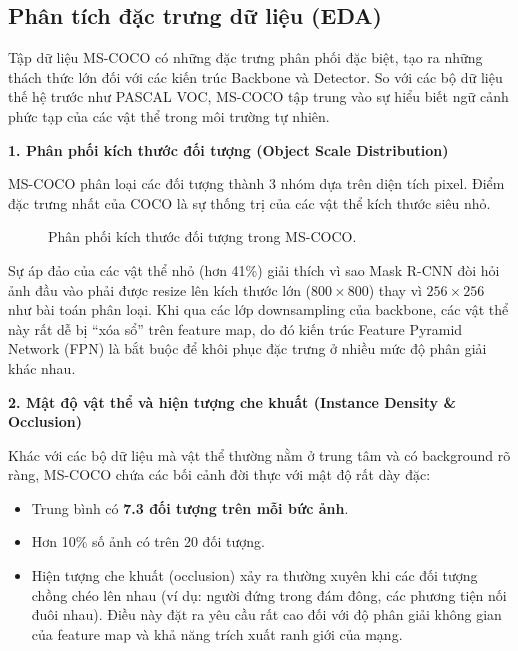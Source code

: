 \subsection{Phân tích đặc trưng dữ liệu (EDA)}
\label{subsec:coco_eda}

Tập dữ liệu MS-COCO có những đặc trưng phân phối đặc biệt, tạo ra những thách thức lớn đối với các kiến trúc Backbone và Detector. So với các bộ dữ liệu thế hệ trước như PASCAL VOC, MS-COCO tập trung vào sự hiểu biết ngữ cảnh phức tạp của các vật thể trong môi trường tự nhiên.

\textbf{1. Phân phối kích thước đối tượng (Object Scale Distribution)}

MS-COCO phân loại các đối tượng thành 3 nhóm dựa trên diện tích pixel. Điểm đặc trưng nhất của COCO là sự thống trị của các vật thể kích thước siêu nhỏ.

\begin{figure}[H]
\centering
{}
\caption{Phân phối kích thước đối tượng trong MS-COCO.}
\label{fig:coco_scale}
\end{figure}

Sự áp đảo của các vật thể nhỏ (hơn 41\%) giải thích vì sao Mask R-CNN đòi hỏi ảnh đầu vào phải được resize lên kích thước lớn ($800 \times 800$) thay vì $256 \times 256$ như bài toán phân loại. Khi qua các lớp downsampling của backbone, các vật thể này rất dễ bị ``xóa sổ'' trên feature map, do đó kiến trúc Feature Pyramid Network (FPN) là bắt buộc để khôi phục đặc trưng ở nhiều mức độ phân giải khác nhau.

\textbf{2. Mật độ vật thể và hiện tượng che khuất (Instance Density \& Occlusion)}

Khác với các bộ dữ liệu mà vật thể thường nằm ở trung tâm và có background rõ ràng, MS-COCO chứa các bối cảnh đời thực với mật độ rất dày đặc:
\begin{itemize}
    \item Trung bình có \textbf{7.3 đối tượng trên mỗi bức ảnh}.
    \item Hơn 10\% số ảnh có trên 20 đối tượng.
    \item Hiện tượng che khuất (occlusion) xảy ra thường xuyên khi các đối tượng chồng chéo lên nhau (ví dụ: người đứng trong đám đông, các phương tiện nối đuôi nhau). Điều này đặt ra yêu cầu rất cao đối với độ phân giải không gian của feature map và khả năng trích xuất ranh giới của mạng.
\end{itemize}

